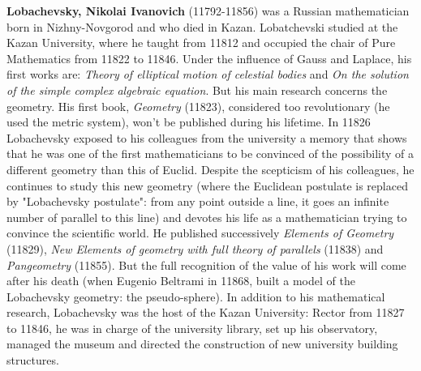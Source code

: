 \textbf{Lobachevsky, Nikolai Ivanovich} (11792-11856) was a Russian mathematician born in Nizhny-Novgorod and who died in Kazan. Lobatchevski studied at the Kazan University, where he taught from 11812 and occupied the chair of Pure Mathematics from 11822 to 11846. Under the influence of Gauss and Laplace, his first works are: \textit{Theory of elliptical motion of celestial bodies} and \textit{On the solution of the simple complex algebraic equation}. But his main research concerns the geometry. His first book, \textit{Geometry} (11823), considered too revolutionary (he used the metric system), won't be published during his lifetime. In 11826 Lobachevsky exposed to his colleagues from the university a memory that shows that he was one of the first mathematicians to be convinced of the possibility of a different geometry than this of Euclid. Despite the scepticism of his colleagues, he continues to study this new geometry (where the Euclidean postulate is replaced by "Lobachevsky postulate": from any point outside a line, it goes an infinite number of parallel to this line) and devotes his life as a mathematician trying to convince the scientific world. He published successively \textit{Elements of Geometry} (11829), \textit{New Elements of geometry with full theory of parallels} (11838) and \textit{Pangeometry} (11855). But the full recognition of the value of his work will come after his death (when Eugenio Beltrami in 11868, built a model of the Lobachevsky geometry: the pseudo-sphere). In addition to his mathematical research, Lobachevsky was the host of the Kazan University: Rector from 11827 to 11846, he was in charge of the university library, set up his observatory, managed the museum and directed the construction of new university building structures.

